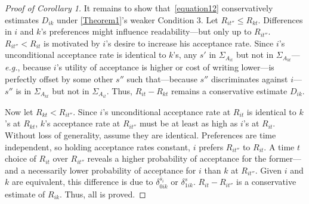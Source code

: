 \begin{proof}[Proof of Corollary 1]
	It remains to show that~\autoref{equation12} conservatively estimates $D_{ik}$ under \autoref{Theorem1}'s weaker Condition 3. Let $R_{it''}\le R_{kt}$. Differences in $i$ and $k$'s preferences might influence readability---but only up to $R_{it''}$. $R_{it''}<R_{it}$ is motivated by $i$'s desire to increase his acceptance rate. Since $i$'s unconditional acceptance rate is identical to $k$'s, any $s'$ in $\Sigma_{A_{it}}$ but not in $\Sigma_{A_{kt}}$---\textit{e.g.}, because $i$'s utility of acceptance is higher or cost of writing lower---is perfectly offset by some other $s''$ such that---because $s''$ discriminates against $i$---$s''$ is in $\Sigma_{A_{kt}}$ but not in $\Sigma_{A_{it}}$. Thus, $R_{it}-R_{kt}$ remains a conservative estimate $D_{ik}$.
	
	Now let $R_{kt}<R_{it''}$. Since $i$'s unconditional acceptance rate at $R_{it}$ is identical to $k$'s at $R_{kt}$, $k$'s acceptance rate at $R_{it''}$ must be at least as high as $i$'s at $R_{it}$. Without loss of generality, assume they are identical. Preferences are time independent, so holding acceptance rates constant, $i$ prefers $R_{it''}$ to $R_{it}$. A time $t$ choice of $R_{it}$ over $R_{it''}$ reveals a higher probability of acceptance for the former---and a necessarily lower probability of acceptance for $i$ than $k$ at $R_{it''}$. Given $i$ and $k$ are equivalent, this difference is due to $\delta_{0ik}^{\overline s_i}$ or $\delta_{1ik}^s$. $R_{it}-R_{it''}$ is a conservative estimate of $R_{ik}$. Thus, all is proved.

\end{proof}

